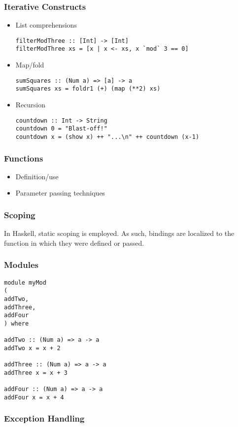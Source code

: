 \documentclass[titlepage,12pt]{article}
\newcommand{\bi}{\begin{itemize}}
\newcommand{\ei}{\end{itemize}}
\begin{document}
\subsubsection{Iterative Constructs}
\bi
    \item List comprehensions
\begin{verbatim}
filterModThree :: [Int] -> [Int]
filterModThree xs = [x | x <- xs, x `mod` 3 == 0]
\end{verbatim}
    \item Map/fold
\begin{verbatim}
sumSquares :: (Num a) => [a] -> a
sumSquares xs = foldr1 (+) (map (**2) xs)
\end{verbatim}
    \item Recursion
\begin{verbatim}
countdown :: Int -> String
countdown 0 = "Blast-off!"
countdown x = (show x) ++ "...\n" ++ countdown (x-1)
\end{verbatim}
\ei

\subsubsection{Functions}
\bi
    \item Definition/use
    \item Parameter passing techniques
\ei

\subsubsection{Scoping}
In Haskell, static scoping is employed.  As such, bindings are localized
to the function in which they were defined or passed.

\subsubsection{Modules}
\begin{verbatim}
module myMod 
( 
addTwo,
addThree,
addFour
) where

addTwo :: (Num a) => a -> a
addTwo x = x + 2

addThree :: (Num a) => a -> a
addThree x = x + 3

addFour :: (Num a) => a -> a
addFour x = x + 4
\end{verbatim}
\subsubsection{Exception Handling}
\end{document}
